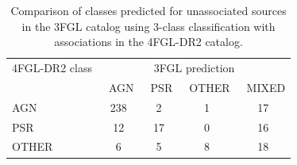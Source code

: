 \begin{table}[!h]
\centering
\hspace{-0.2cm}
    \vspace{2mm}
    \caption{Testing accuracy of the four selected algorithms for the 3-class classification of 3FGL sources and comparison with associations in the 4FGL-DR2 catalog. 
    ``\_O'' denotes training with oversampling.}
    \label{tab:selected_algs_multi}
\end{table}


\begin{table}[!h]
\centering
 \renewcommand{\tabcolsep}{0.3mm}
\renewcommand{\arraystretch}{1.5}

    \begin{tabular}{l c c c c}
    \hline
    \hline
    4FGL-DR2 class & \multicolumn{4}{c}{3FGL prediction} \\
      &\ AGN &\ PSR &\ OTHER &\ MIXED \\
    \hline
    AGN & 238 & 2 &  1 & 17 \\ %
    PSR & 12 & 17 &  0 & 16 \\ %
    OTHER & 6 & 5 & 8 & 18 \\ %
    \hline
    \end{tabular}%
    \vspace{2mm}
    \caption{Comparison of classes predicted for unassociated sources in the 3FGL catalog using 3-class classification
    with associations in the 4FGL-DR2 catalog. 
}
    \label{tab:3FGL_vs_4FGL_3class}
\end{table}



